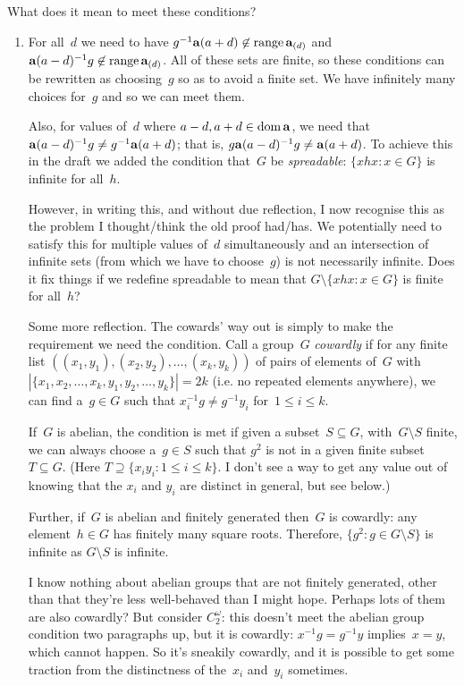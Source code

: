 \documentclass[a4paper,12pt]{article}
\newcommand{\dom}{\mathop{\rm dom}\nolimits}
\newcommand{\range}{\mathop{\rm range}\nolimits}
\begin{document}
What does it mean to meet these conditions?

\begin{enumerate}

\item For all~$d$ we need to have $g^{-1} {\bf a}(a+d) \not\in \range{ {\bf a}_{(d)} }$ and ${\bf a}(a-d)^{-1} g \not\in \range{ {\bf a}_{(d)} }$. All of these sets are finite, so these conditions can be rewritten as choosing~$g$ so as to avoid a finite set.  We have infinitely many choices for~$g$ and so we can meet them.  

Also, for values of~$d$ where $a-d, a+d \in \dom{{\bf a}}$, we need that ${\bf a}(a-d)^{-1} g \neq g^{-1} {\bf a}(a+d)$; that is, $g {\bf a}(a-d)^{-1} g \neq {\bf a}(a+d)$.  To achieve this in the draft we added the condition that~$G$ be {\em spreadable}: $\{ xhx : x \in G \}$ is infinite for all~$h$.  

However, in writing this, and without due reflection, I now recognise this as the problem I thought/think the old proof had/has.  We potentially need to satisfy this for multiple values of~$d$ simultaneously and an intersection of infinite sets (from which we have to choose~$g$) is not necessarily infinite.  Does it fix things if we redefine spreadable to mean that $G \setminus \{ xhx : x \in G \}$ is finite for all~$h$?  

Some more reflection.  The cowards' way out is simply to make the requirement we need the condition.  Call a group~$G$ {\em cowardly} if for any finite list $( (x_1, y_1),(x_2,y_2), \ldots, (x_k,y_k))$  of pairs of elements of~$G$ with~$| \{x_1, x_2, \ldots, x_k, y_1, y_2, \ldots, y_k \} | = 2k$ (i.e. no repeated elements anywhere), we can find a~$g \in G$ such that $x_i^{-1}g \neq g^{-1}y_i$ for~$1 \leq i \leq k$.

If~$G$ is abelian, the condition is met if given a subset~$S \subseteq G$, with~$G \setminus S$ finite, we can always choose a~$g \in S$ such that $g^2$ is not in a given finite subset $T \subseteq G$.  (Here $T \supseteq \{ x_iy_i : 1 \leq i \leq k \}$. I don't see a way to get any value out of knowing that the $x_i$ and $y_i$ are distinct in general, but see below.)  

Further, if~$G$ is abelian and finitely generated then~$G$ is cowardly: any element~$h \in G$ has finitely many square roots.  Therefore, $\{ g^2 : g \in G \setminus S \}$ is infinite as $G \setminus S$ is infinite.  

I know nothing about abelian groups that are not finitely generated, other than that they're less well-behaved than I might hope.  Perhaps lots of them are also cowardly?  But consider $C_2^{\omega}$: this doesn't meet the abelian group condition two paragraphs up, but it is cowardly: $x^{-1}g = g^{-1}y$ implies~$x=y$, which cannot happen.  So it's sneakily cowardly, and it is possible to get some traction from the distinctness of the~$x_i$ and~$y_i$ sometimes.


\end{enumerate}
\end{document}
